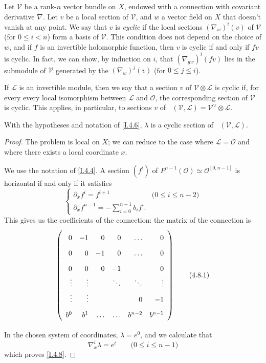 \documentclass{report}
\theoremstyle{plain}
\newenvironment{lemma}[1]
    {\renewcommand\theinnercustomlemma{#1}\innercustomlemma}
    {\endinnercustomlemma}
\theoremstyle{definition}
\newenvironment{env}[1]
    {\renewcommand\theinnercustomenv{#1}\innercustomenv}
    {\endinnercustomenv}
\newcommand{\sh}[1]{{\mathscr{#1}}}
\renewcommand{\leq}{\leqslant}
\DeclareMathOperator{\shHom}{\underline{Hom}}
\newcommand{\oldpage}[1]{\marginpar{\footnotesize$\Big\vert$ \textit{p.~#1}}}
\begin{document}
\oldpage{26}
\begin{env}{4.7}
\label{I.4.7}
  Let $\sh{V}$ be a rank-$n$ vector bundle on $X$, endowed with a connection with covariant derivative $\nabla$.
  Let $v$ be a local section of $\sh{V}$, and $w$ a vector field on $X$ that doesn't vanish at any point.
  We say that $v$ is \emph{cyclic} if the local sections $(\nabla_w)^i(v)$ of $\sh{V}$ (for $0\leq i<n$) form a basis of $\sh{V}$.
  This condition does not depend on the choice of $w$, and if $f$ is an invertible holomorphic function, then $v$ is cyclic if and only if $fv$ is cyclic.
  In fact, we can show, by induction on $i$, that $(\nabla_{gw})^i(fv)$ lies in the submodule of $\sh{V}$ generated by the $(\nabla_w)^j(v)$ (for $0\leq j\leq i$).

  If $\sh{L}$ is an invertible module, then we say that a section $v$ of $\sh{V}\otimes\sh{L}$ is cyclic if, for every every local isomorphism between $\sh{L}$ and $\sh{O}$, the corresponding section of $\sh{V}$ is cyclic.
  This applies, in particular, to sections $v$ of $\shHom(\sh{V},\sh{L})=\sh{V}^\vee\otimes\sh{L}$.
\end{env}

\begin{lemma}{4.8}
\label{I.4.8}
  With the hypotheses and notation of \cref{I.4.6}, $\lambda$ is a cyclic section of $\shHom(\sh{V},\sh{L})$.
\end{lemma}

\begin{proof}
  The problem is local on $X$;
  we can reduce to the case where $\sh{L}=\sh{O}$ and where there exists a local coordinate $x$.

  We use the notation of \cref{I.4.4}.
  A section $(f^i)$ of $P^{n-1}(\sh{O})\simeq\sh{O}^{[0,n-1]}$ is horizontal if and only if it satisfies
  \[
    \begin{cases}
      \partial_x f^i = f^{i+1}
      & \mbox{($0\leq i\leq n-2$)}
    \\\partial_x f^{n-1} = -\sum_{i=0}^{n-1} b_i f^i.
    \end{cases}
  \]
  This gives us the coefficients of the connection: the matrix of the connection is
  \[
  \label{I.4.8.1}
    \left(
      \def\arraystretch{1.8}
      \begin{array}{rrrrrr}
        0 & -1 & 0 & 0 & \ldots & 0
      \\0 & 0 & -1 & 0 & \ldots & 0
      \\0 & 0 & 0 & -1 & & 0
      \\\vdots & \vdots & & \ddots & \ddots & \vdots
      \\\vdots & \vdots & & & 0 & -1
      \\b^0 & b^1 & \ldots & \ldots & b^{n-2} & b^{n-1}
      \end{array}
    \right)
  \tag{4.8.1}
  \]

\oldpage{27}
  In the chosen system of coordinates, $\lambda=e^0$, and we calculate that
  \[
    \nabla_x^i\lambda = e^i
    \qquad\mbox{($0\leq i\leq n-1$)}
  \]
  which proves \cref{I.4.8}.
\end{proof}
\end{document}

